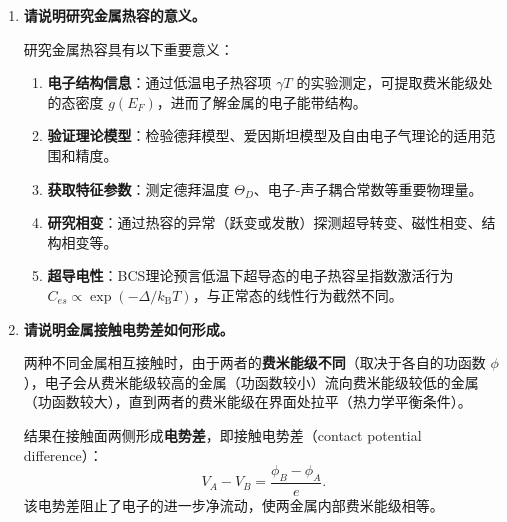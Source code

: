 \begin{enumerate}[label=\textbf{\arabic*.}, leftmargin=2em, itemsep=0.8em, resume]
在晶格振动势能展开中，仅保留位移的二次项（\textbf{简谐近似}）可导出独立的声子图像，成功解释晶格比热容（爱因斯坦模型、德拜模型），但\textbf{无法解释热膨胀和热传导}等现象。

当考虑位移的三次及更高次项时，即为\textbf{非简谐效应}（anharmonic effect）。非简谐项导致：
\begin{itemize}[nosep]
    \item 声子之间存在相互作用（声子散射），是晶格热阻的来源；
    \item 热膨胀（格林爱森参数 $\gamma$ 描述）；
    \item 声子倒逆过程（Umklapp process，U过程），对热导率有重要影响。
\end{itemize}

\item \textbf{请说明研究金属热容的意义。}

研究金属热容具有以下重要意义：
\begin{enumerate}[nosep, label=(\arabic*)]
    \item \textbf{电子结构信息}：通过低温电子热容项 $\gamma T$ 的实验测定，可提取费米能级处的态密度 $g(E_F)$，进而了解金属的电子能带结构。
    \item \textbf{验证理论模型}：检验德拜模型、爱因斯坦模型及自由电子气理论的适用范围和精度。
    \item \textbf{获取特征参数}：测定德拜温度 $\Theta_D$、电子-声子耦合常数等重要物理量。
    \item \textbf{研究相变}：通过热容的异常（跃变或发散）探测超导转变、磁性相变、结构相变等。
    \item \textbf{超导电性}：BCS理论预言低温下超导态的电子热容呈指数激活行为 $C_{es} \propto \exp(-\Delta/k_{\text{B}}T)$，与正常态的线性行为截然不同。
\end{enumerate}

\item \textbf{请说明金属接触电势差如何形成。}

两种不同金属相互接触时，由于两者的\textbf{费米能级不同}（取决于各自的功函数 $\phi$），电子会从费米能级较高的金属（功函数较小）流向费米能级较低的金属（功函数较大），直到两者的费米能级在界面处拉平（热力学平衡条件）。

结果在接触面两侧形成\textbf{电势差}，即接触电势差（contact potential difference）：
\[
    V_A - V_B = \frac{\phi_B - \phi_A}{e}.
\]
该电势差阻止了电子的进一步净流动，使两金属内部费米能级相等。


\end{enumerate}
